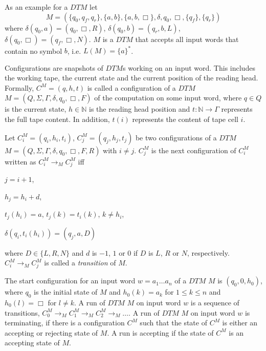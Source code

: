 \begin{example}
    \label{example:dtm}
    As an example for a $\mathit{DTM}$ let
    \[M = (\{q_0, q_f, q_r\}, \{a, b\}, \{a, b, \Box\}, \delta, q_0, \Box, \{q_f\}, \{q_r\})\]
    where $\delta(q_0, a)= (q_0, \Box, R)$, $\delta(q_0, b) = (q_r, b, L)$, $\delta(q_0, \Box) = (q_f, \Box, N)$.
    $M$ is a $\mathit{DTM}$ that accepts all input words that contain no symbol $b$, i.e. $L(M) = \{a\}^*$.
\end{example}

Configurations are snapshots of $\mathit{DTM}$s working on an input word. This includes the working tape, the current
state and the current position of the reading head. Formally, $C^M = (q, h, t)$ is called a
configuration of a $\mathit{DTM}$ $M = (Q, \Sigma, \Gamma, \delta, q_0, \Box, F)$ of the computation on some input
word, where $q \in Q$ is the current state, $h \in \mathbb{N}$ is the reading head position and $t: \mathbb{N}
\rightarrow \Gamma$ represents the full tape content. In addition, $t(i)$ represents the content of tape cell $i$.

\begin{definition}
    Let $C_i^M = (q_i, h_i, t_i)$, $C_j^M = (q_j, h_j, t_j)$ be two configurations of a
    $\mathit{DTM}$ $M = (Q, \Sigma, \Gamma, \delta, q_0, \Box, F, R)$ with $i \neq j$. $C_j^M$ is the next configuration
    of $C_i^M$ written as $C_i^M \rightarrow_M C_j^M$ iff
    \begin{compactitem}
        \item $j = i + 1$,

        \item $h_j = h_i + d$,

        \item $t_j(h_i) = a$, $t_j(k) = t_i(k)$, $k \neq h_i$,

        \item $\delta(q_i, t_i(h_i)) = (q_j, a, D)$
    \end{compactitem}
    where $D \in \{L, R, N\}$ and $d$ is $-1$, $1$ or $0$ if $D$ is $L$, $R$ or $N$, respectively. $C_i^M \rightarrow_M C_j^M$ is
    called a \emph{transition} of $M$.
\end{definition}

The start configuration for an input word $w = a_1\dots a_n$ of a $\mathit{DTM}$ $M$ is $(q_0, 0, h_{0})$,
where $q_0$ is the initial state of $M$ and $h_0(k) = a_k$ for $1 \leq k \leq n$ and $h_0(l) = \Box$ for $l \neq k$. A
run of $\mathit{DTM}$ $M$ on input word $w$ is a sequence of transitions, $C_0^M \rightarrow_M C_1^M \rightarrow_M
C_2^M \rightarrow_M \dots$. A run of $\mathit{DTM}$ $M$ on input word $w$ is terminating, if there is a
configuration $C^M$ such that the state of $C^M$ is either an accepting or rejecting
state of $M$. A run is accepting if the state of $C^M$ is an accepting state of $M$.

